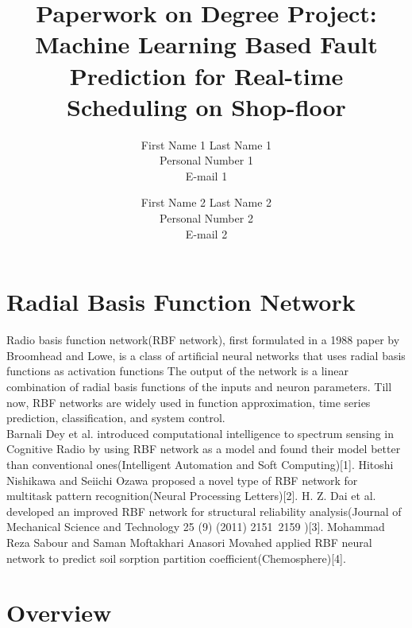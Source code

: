 \documentclass[a4paper,12pt,oneside,onecolumn]{article} %
\begin{document}

\title{Paperwork on Degree Project: Machine Learning Based Fault Prediction for Real-time Scheduling on Shop-floor}
\author{
  First Name 1 Last Name 1 \\ Personal Number 1 \\ E-mail 1 
  \and 
  First Name 2 Last Name 2 \\ Personal Number 2 \\ E-mail 2
  }

\maketitle                     %





\section*{Radial Basis Function Network}
Radio basis function network(RBF network), first formulated in a 1988 paper by Broomhead and Lowe, is a class of artificial neural networks that uses radial basis functions as activation functions The output of the network is a linear combination of radial basis functions of the inputs and neuron parameters. Till now, RBF networks are widely used in  function approximation, time series prediction, classification, and system control.
\\
Barnali Dey et al. introduced computational intelligence to spectrum sensing in Cognitive Radio by using RBF network as a model and found their model better than conventional ones(Intelligent Automation and Soft Computing)[1]. Hitoshi Nishikawa and Seiichi Ozawa proposed a novel type of RBF network for multitask pattern recognition(Neural Processing Letters)[2]. H. Z. Dai et al. developed an improved RBF network for structural reliability analysis(Journal of Mechanical Science and Technology 25 (9) (2011) 2151~2159 )[3]. Mohammad Reza Sabour and Saman Moftakhari Anasori Movahed applied RBF neural network to predict soil sorption partition coefficient(Chemosphere)[4].

\section*{Overview}
\end{document}
